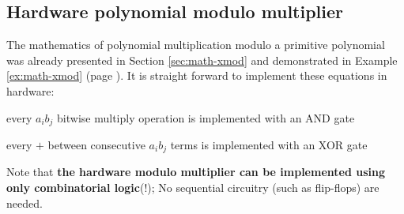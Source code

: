 \subsection{Hardware polynomial modulo multiplier}
\label{sec:hw-xmod}
The mathematics of polynomial multiplication modulo a primitive polynomial 
was already presented in Section \ref{sec:math-xmod}
and demonstrated in Example \ref{ex:math-xmod} (page \pageref{ex:math-xmod}).
It is straight forward to implement these equations in hardware:
\begin{liste}
   \item every $a_ib_j$ bitwise multiply operation is implemented with an AND gate
   \item every $+$ between consecutive $a_ib_j$ terms is implemented with an XOR gate
\end{liste}
Note that {\bf the hardware modulo multiplier can be implemented 
using only combinatorial logic}(!);
No sequential circuitry (such as flip-flops) are needed.



